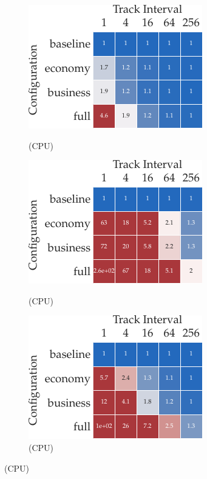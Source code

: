\captionsetup[subfigure]{justification=justified,singlelinecheck=false}

\begin{figure}[t]
  \centering
  \begin{subfigure}[t]{0.35\linewidth}
    \centering
    \caption{\mnist \MNISTNET (CPU)}
    \includegraphics{../repos/cockpit-paper/fig/01_benchmark/output/fig_grid/benchmark_mnist_logreg_cpu_app_thesis-wide}
    \label{cockpit::fig:app_benchmark_configurations_cpu-mnist_logreg}
  \end{subfigure}
  \hspace{0.1\linewidth}
  \begin{subfigure}[t]{0.35\linewidth}
    \centering
    \caption{\mnist \mlp (CPU)}
    \includegraphics{../repos/cockpit-paper/fig/01_benchmark/output/fig_grid/benchmark_mnist_mlp_cpu_app_thesis-wide}
    \label{cockpit::fig:app_benchmark_configurations_cpu-mnist_mlp}
  \end{subfigure}
  \begin{subfigure}[t]{0.35\linewidth}
    \centering
    \caption{\cifarten \threecthreed (CPU)}
    \includegraphics{../repos/cockpit-paper/fig/01_benchmark/output/fig_grid/benchmark_cifar10_3c3d_cpu_app_thesis-wide}

\end{subfigure}
\end{figure}
